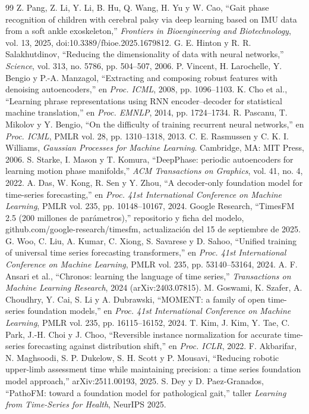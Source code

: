 \documentclass[11pt,a4paper]{article}
\begin{document}
\begin{thebibliography}{99}
 Z. Pang, Z. Li, Y. Li, B. Hu, Q. Wang, H. Yu y W. Cao, ``Gait phase recognition of children with cerebral palsy via deep learning based on IMU data from a soft ankle exoskeleton,'' \emph{Frontiers in Bioengineering and Biotechnology}, vol. 13, 2025, doi:10.3389/fbioe.2025.1679812.
 G. E. Hinton y R. R. Salakhutdinov, ``Reducing the dimensionality of data with neural networks,'' \emph{Science}, vol. 313, no. 5786, pp. 504--507, 2006.
 P. Vincent, H. Larochelle, Y. Bengio y P.-A. Manzagol, ``Extracting and composing robust features with denoising autoencoders,'' en \emph{Proc. ICML}, 2008, pp. 1096--1103.
 K. Cho et al., ``Learning phrase representations using RNN encoder--decoder for statistical machine translation,'' en \emph{Proc. EMNLP}, 2014, pp. 1724--1734.
 R. Pascanu, T. Mikolov y Y. Bengio, ``On the difficulty of training recurrent neural networks,'' en \emph{Proc. ICML}, PMLR vol. 28, pp. 1310--1318, 2013.
 C. E. Rasmussen y C. K. I. Williams, \emph{Gaussian Processes for Machine Learning}. Cambridge, MA: MIT Press, 2006.
 S. Starke, I. Mason y T. Komura, ``DeepPhase: periodic autoencoders for learning motion phase manifolds,'' \emph{ACM Transactions on Graphics}, vol. 41, no. 4, 2022.
 A. Das, W. Kong, R. Sen y Y. Zhou, ``A decoder-only foundation model for time-series forecasting,'' en \emph{Proc. 41st International Conference on Machine Learning}, PMLR vol. 235, pp. 10148--10167, 2024.
 Google Research, ``TimesFM 2.5 (200 millones de parámetros),'' repositorio y ficha del modelo, github.com/google-research/timesfm, actualización del 15 de septiembre de 2025.
 G. Woo, C. Liu, A. Kumar, C. Xiong, S. Savarese y D. Sahoo, ``Unified training of universal time series forecasting transformers,'' en \emph{Proc. 41st International Conference on Machine Learning}, PMLR vol. 235, pp. 53140--53164, 2024.
 A. F. Ansari et al., ``Chronos: learning the language of time series,'' \emph{Transactions on Machine Learning Research}, 2024 (arXiv:2403.07815).
 M. Goswami, K. Szafer, A. Choudhry, Y. Cai, S. Li y A. Dubrawski, ``MOMENT: a family of open time-series foundation models,'' en \emph{Proc. 41st International Conference on Machine Learning}, PMLR vol. 235, pp. 16115--16152, 2024.
 T. Kim, J. Kim, Y. Tae, C. Park, J.-H. Choi y J. Choo, ``Reversible instance normalization for accurate time-series forecasting against distribution shift,'' en \emph{Proc. ICLR}, 2022.
 F. Akbarifar, N. Maghsoodi, S. P. Dukelow, S. H. Scott y P. Mousavi, ``Reducing robotic upper-limb assessment time while maintaining precision: a time series foundation model approach,'' arXiv:2511.00193, 2025.
 S. Dey y D. Paez-Granados, ``PathoFM: toward a foundation model for pathological gait,'' taller \emph{Learning from Time-Series for Health}, NeurIPS 2025.
\end{thebibliography}
\end{document}
